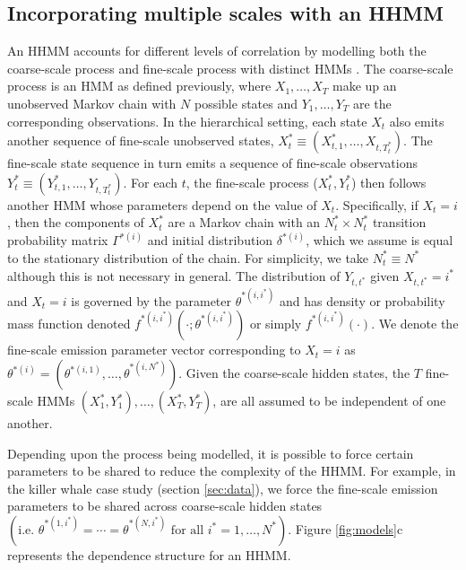 \subsection{Incorporating multiple scales with an HHMM}

An HHMM accounts for different levels of correlation by modelling both the coarse-scale process and fine-scale process with distinct HMMs \citep{Barajas:2017,Adam:2019}. The coarse-scale process is an HMM as defined previously, where $X_1, \ldots, X_T$ make up an unobserved Markov chain with $N$ possible states and $Y_1,\ldots, Y_T$ are the corresponding observations.   
%
In the hierarchical setting, each state $X_t$ also emits another sequence of fine-scale unobserved states, $X_t^* \equiv (X_{t,1}^*,\ldots, X_{t,T_t^*})$. The fine-scale state sequence in turn emits a sequence of fine-scale observations $Y_t^* \equiv (Y_{t,1}^*,\ldots, Y_{t,T_t^*})$. For each $t$, the fine-scale process ($X_t^*, Y_t^*$) then follows another HMM whose parameters depend on the value of $X_t$. Specifically, if $X_t=i$, then the components of $X_t^*$ are a Markov chain with an $N^*_t \times N^*_t$ transition probability matrix $\Gamma^{*(i)}$ and initial distribution $\delta^{*(i)}$, which we assume is equal to the stationary distribution of the chain. For simplicity, we take $N_t^* \equiv N^*$ although this is not necessary in general. The distribution of $Y_{t,t^*}$ given $X_{t,t^*}=i^*$ and $X_t=i$ is governed by the parameter $\theta^{*(i,i^*)}$ and has density or probability mass function denoted $f^{*(i,i^*)}\left(\cdot; \theta^{*(i,i^*)}\right)$ or simply $f^{*(i,i^*)}(\cdot)$. We denote the fine-scale emission parameter vector corresponding to $X_t=i$ as $\theta^{*(i)}=\left(\theta^{*(i,1)}, \ldots, \theta^{*(i,N^*)}\right)$. Given the coarse-scale hidden states, the $T$ fine-scale HMMs $(X_1^*, Y_1^*), \ldots, (X_T^*, Y_T^*)$, are all assumed to be independent of one another.

Depending upon the process being modelled, it is possible to force certain parameters to be shared to reduce the complexity of the HHMM. For example, in the killer whale case study (section \ref{sec:data}), we force the fine-scale emission parameters to be shared across coarse-scale hidden states $\left( \text{i.e. } \theta^{*(1,i^*)} = \cdots = \theta^{*(N,i^*)} \text{ for all } i^* = 1, \ldots, N^* \right)$. Figure \ref{fig:models}c represents the dependence structure for an HHMM. 

